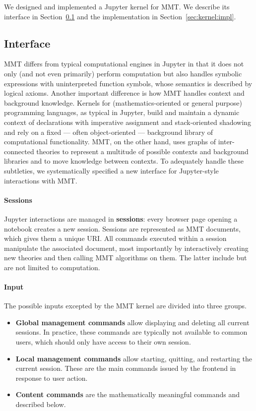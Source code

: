We designed and implemented a Jupyter kernel for MMT.
We describe its interface in Section~\ref{sec:kernel:syntax} and the implementation in Section~\ref{sec:kernel:impl}.

\subsection{Interface}\label{sec:kernel:syntax}

MMT differs from typical computational engines in Jupyter in that it does not only (and not even primarily) perform computation but also handles symbolic expressions with uninterpreted function symbols, whose semantics is described by logical axioms.
Another important difference is how MMT handles context and background knowledge.
Kernels for (mathematics-oriented or general purpose) programming languages, as typical in Jupyter, build and maintain a dynamic context of declarations with imperative assignment and stack-oriented shadowing and rely on a fixed --- often object-oriented --- background library of computational functionality.
MMT, on the other hand, uses graphs of inter-connected theories to represent a multitude of possible contexts and background libraries and to move knowledge between contexts.
To adequately handle these subtleties, we systematically specified a new interface for Jupyter-style interactions with MMT.

\paragraph{Sessions}
Jupyter interactions are managed in \textbf{sessions}: every browser page opening a notebook creates a new session.
Sessions are represented as MMT documents, which gives them a unique URI.
All commands executed within a session manipulate the associated document, most importantly by interactively creating new theories and then calling MMT algorithms on them.
The latter include but are not limited to computation.

\paragraph{Input}
The possible inputs excepted by the MMT kernel are divided into three groups.
\begin{itemize}
\item \textbf{Global management commands} allow displaying and deleting all current sessions.
 In practice, these commands are typically not available to common users, which should only have access to their own session.
\item \textbf{Local management commands} allow starting, quitting, and restarting the current session. These are the main commands issued by the frontend in response to user action.
\item \textbf{Content commands} are the mathematically meaningful commands and described below.
\end{itemize}


